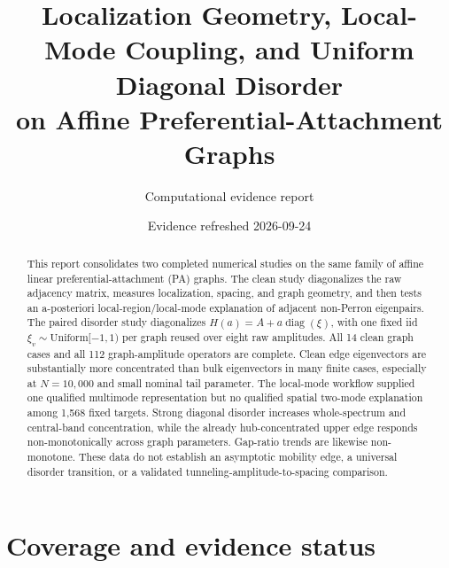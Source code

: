 \documentclass[11pt]{article}
\title{Localization Geometry, Local-Mode Coupling, and Uniform Diagonal Disorder\\
on Affine Preferential-Attachment Graphs}
\author{Computational evidence report}
\date{Evidence refreshed 2026-09-24}
\begin{document}
\maketitle

\begin{abstract}
This report consolidates two completed numerical studies on the same family of affine linear preferential-attachment (PA) graphs.  The clean study diagonalizes the raw adjacency matrix, measures localization, spacing, and graph geometry, and then tests an a-posteriori local-region/local-mode explanation of adjacent non-Perron eigenpairs.  The paired disorder study diagonalizes
\(H(a)=A+a\operatorname{diag}(\xi)\), with one fixed iid \(\xi_v\sim\mathrm{Uniform}[-1,1)\) per graph reused over eight raw amplitudes.  All 14 clean graph cases and all 112 graph-amplitude operators are complete.  Clean edge eigenvectors are substantially more concentrated than bulk eigenvectors in many finite cases, especially at \(N=10{,}000\) and small nominal tail parameter.  The local-mode workflow supplied one qualified multimode representation but no qualified spatial two-mode explanation among 1,568 fixed targets.  Strong diagonal disorder increases whole-spectrum and central-band concentration, while the already hub-concentrated upper edge responds non-monotonically across graph parameters.  Gap-ratio trends are likewise non-monotone.  These data do not establish an asymptotic mobility edge, a universal disorder transition, or a validated tunneling-amplitude-to-spacing comparison.
\end{abstract}

\section*{Coverage and evidence status}
\end{document}
